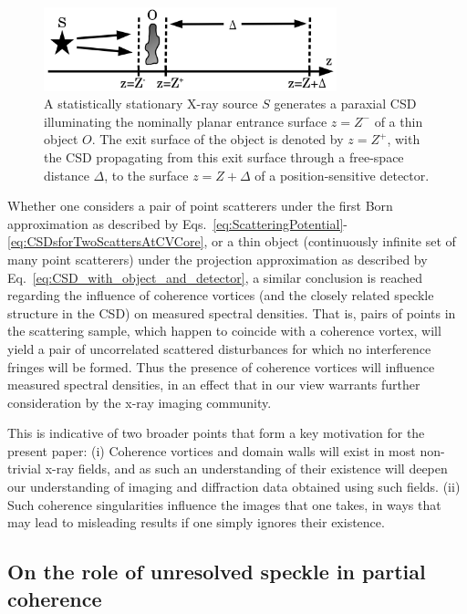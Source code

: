 \documentclass[%
 reprint,
 amsmath,amssymb,
 aps,
]{revtex4-1}
\begin{document}
\begin{figure}
\includegraphics[width=8.5cm]{Figures/ImagingWithCoherenceVortex.png}
\caption{A statistically stationary X-ray source $S$ generates a paraxial CSD illuminating the nominally planar entrance surface $z=Z^-$ of a thin object $O$.  The exit surface of the object is denoted by $z=Z^+$, with the CSD propagating from this exit surface through a free-space distance $\Delta$, to the surface $z=Z+\Delta$ of a position-sensitive detector.}
\label{fig:ImagingWithCoherenceVortex}
\end{figure}

Whether one considers a pair of point scatterers under the first Born approximation as described by Eqs.~\ref{eq:ScatteringPotential}-\ref{eq:CSDsforTwoScattersAtCVCore}, or a thin object (continuously infinite set of many point scatterers) under the projection approximation as described by Eq.~\ref{eq:CSD_with_object_and_detector}, a similar conclusion is reached regarding the influence of coherence vortices (and the closely related speckle structure in the CSD) on measured spectral densities.  That is, pairs of points in the scattering sample, which happen to coincide with a coherence vortex, will yield a pair of uncorrelated scattered disturbances for which no interference fringes will be formed.  Thus the presence of coherence vortices will influence measured spectral densities, in an effect that in our view warrants further consideration by the x-ray imaging community.  

This is indicative of two broader points that form a key motivation for the present paper: (i) Coherence vortices and domain walls will exist in most non-trivial x-ray fields, and as such an understanding of their existence will deepen our understanding of imaging and diffraction data obtained using such fields. (ii) Such coherence singularities influence the images that one takes, in ways that may lead to misleading results if one simply ignores their existence.   

\subsection{On the role of unresolved speckle in partial coherence}\label{subsec:Discussion-part-2}
\end{document}
